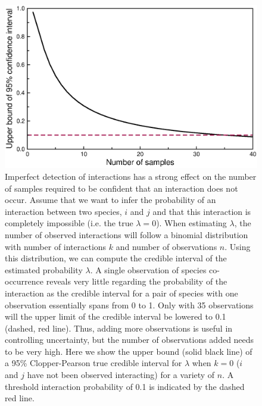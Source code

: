 \documentclass[12pt]{article}
\begin{document}
  \begin{figure}[h!]
    \caption{Imperfect detection of interactions has a strong effect on the number of samples required to be confident that an interaction does not occur. Assume that we want to infer the probability of an interaction between two species, $i$ and $j$ and that this interaction is completely impossible (i.e. the true $\lambda=0$). When estimating $\lambda$, the number of observed interactions will follow a binomial distribution with number of interactions $k$ and number of observations $n$. Using this distribution, we can compute the credible interval of the estimated probability $\lambda$. A single observation of species co-occurrence reveals very little regarding the probability of the interaction as the credible interval for a pair of species with one observation essentially spans from 0 to 1. Only with 35 observations will the upper limit of the credible interval be lowered to 0.1 (dashed, red line). Thus, adding more observations is useful in controlling uncertainty, but the number of observations added needs to be very high. Here we show the upper bound (solid black line) of a 95\% Clopper-Pearson true credible interval for $\lambda$ when $k=0$ ($i$ and $j$ have not been observed interacting) for a variety of $n$. A threshold interaction probability of 0.1 is indicated by the dashed red line. }
    \label{upper_limits}
    \begin{center}
    \includegraphics*[width=.8\textwidth]{figures/upper_limit_DG.eps}
    \end{center}
    \end{figure}
\end{document}
